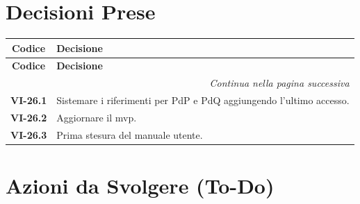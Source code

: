 \section{Decisioni Prese}

\renewcommand{\arraystretch}{1.3}
\vspace{-0.3cm}
\noindent
\begin{longtable}{c p{12cm}}
	\toprule
	\textbf{Codice} & \textbf{Decisione} \\
	\midrule
	\endfirsthead

	\toprule
	\textbf{Codice} & \textbf{Decisione} \\
	\midrule
	\endhead

	\midrule
	\multicolumn{2}{r}{\textit{Continua nella pagina successiva}} \\
	\midrule
	\endfoot

	\bottomrule
	\endlastfoot

	\textbf{VI-26.1} & {Sistemare i riferimenti per PdP e PdQ aggiungendo l'ultimo accesso.} \\
	\textbf{VI-26.2} & {Aggiornare il mvp.} \\
	\textbf{VI-26.3} & {Prima stesura del manuale utente.} \\
	
\end{longtable}

\section{Azioni da Svolgere (To-Do)}

